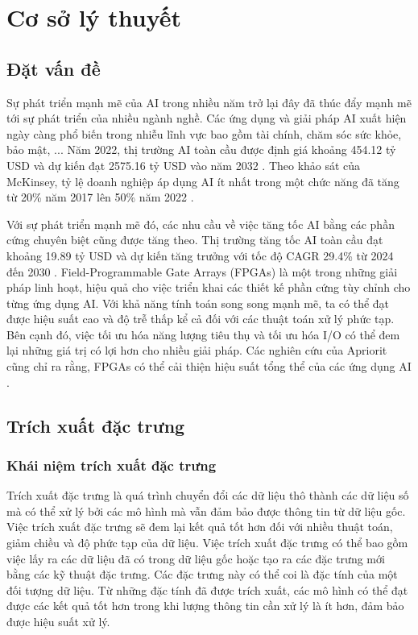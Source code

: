 \clearpage
{}

\setcounter{chapter}{0}
\chapter[{CƠ SỞ LÝ THUYẾT}]{Cơ sở lý thuyết}
\section{Đặt vấn đề}
Sự phát triển mạnh mẽ của AI trong nhiều năm trở lại đây đã thúc đẩy mạnh mẽ tới sự phát triển của nhiều ngành nghề. Các ứng dụng và giải pháp AI xuất hiện ngày càng phổ biến trong nhiễu lĩnh vực bao gồm tài chính, chăm sóc sức khỏe, bảo mật, ... Năm 2022, thị trường AI toàn cầu được định giá khoảng 454.12 tỷ USD và dự kiến đạt 2575.16 tỷ USD vào năm 2032 \cite{AIMARKET}. Theo khảo sát của McKinsey, tỷ lệ doanh nghiệp áp dụng AI ít nhất trong một chức năng đã tăng từ 20\% năm 2017 lên 50\% năm 2022 \cite{mckinsey}.

Với sự phát triển mạnh mẽ đó, các nhu cầu về việc tăng tốc AI bằng các phần cứng chuyên biệt cũng được tăng theo. Thị trường tăng tốc AI toàn cầu đạt khoảng 19.89 tỷ USD và dự kiến tăng trưởng với tốc độ CAGR 29.4\% từ 2024 đến 2030 \cite{aiaccelerator}. 
Field-Programmable Gate Arrays (FPGAs) là một trong những giải pháp linh hoạt, hiệu quả cho việc triển khai các thiết kế phần cứng tùy chỉnh cho từng ứng dụng AI. Với khả năng tính toán song song mạnh mẽ, ta có thể đạt được hiệu suất cao và độ trễ thấp kể cả đối với các thuật toán xử lý phức tạp. Bên cạnh đó, việc tối ưu hóa năng lượng tiêu thụ và tối ưu hóa I/O có thể đem lại những giá trị có lợi hơn cho nhiều giải pháp. Các nghiên cứu của Apriorit cũng chỉ ra rằng, FPGAs có thể cải thiện hiệu suất tổng thể của các ứng dụng AI \cite{apriorit}.
\section{Trích xuất đặc trưng}
\subsection{Khái niệm trích xuất đặc trưng}
Trích xuất đặc trưng là quá trình chuyển đổi các dữ liệu thô thành các dữ liệu số mà có thể xử lý bởi các mô hình mà vẫn đảm bảo được thông tin từ dữ liệu gốc. Việc trích xuất đặc trưng sẽ đem lại kết quả tốt hơn đối với nhiều thuật toán, giảm chiều và độ phức tạp của dữ liệu. Việc trích xuất đặc trưng có thể bao gồm việc lấy ra các dữ liệu đã có trong dữ liệu gốc hoặc tạo ra các đặc trưng mới bằng các kỹ thuật đặc trưng. Các đặc trưng này có thể coi là đặc tính của một đối tượng dữ liệu. Từ những đặc tính đã được trích xuất, các mô hình có thể đạt được các kết quả tốt hơn trong khi lượng thông tin cần xử lý là ít hơn, đảm bảo được hiệu suất xử lý. 

